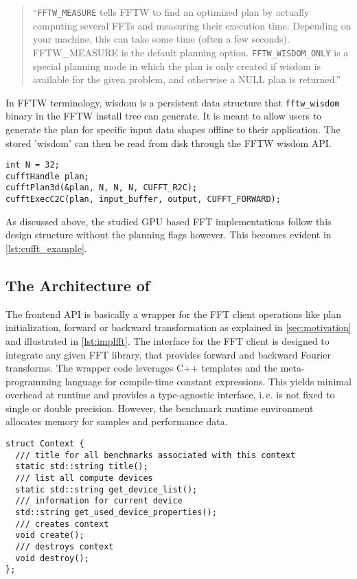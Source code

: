 %
\begin{quote}
``\texttt{FFTW\_MEASURE} tells FFTW to find an optimized plan by actually computing several FFTs and measuring their execution time. Depending on your machine, this can take some time (often a few seconds). FFTW\_MEASURE is the default planning option.\newline
\texttt{FFTW\_WISDOM\_ONLY} is a special planning mode in which the plan is only created if wisdom is available for the given problem, and otherwise a NULL plan is returned.''
\end{quote}
%
In FFTW terminology, wisdom is a persistent data structure that \texttt{fftw\_wisdom} binary in the FFTW install tree can generate. It is meant to allow users to generate the plan for specific input data shapes offline to their application. The stored 'wisdom' can then be read from disk through the FFTW wisdom API.
%
\begin{lstlisting}[caption={Minimal usage example of the cuFFT single precision real-to-complex planner API. Memory management is omitted.},label={lst:cufft_example}]
int N = 32;
cufftHandle plan;
cufftPlan3d(&plan, N, N, N, CUFFT_R2C);
cufftExecC2C(plan, input_buffer, output, CUFFT_FORWARD);
\end{lstlisting}
%
As discussed above, the studied GPU based FFT implementations follow this design structure without the planning flags however. This becomes evident in \cref{lst:cufft_example}.

\subsection{The Architecture of \gearshifft{}}
\label{ssec:gearshifft_arch}

The frontend API is basically a wrapper for the FFT client operations like plan initialization, forward or backward transformation as explained in \cref{sec:motivation} and illustrated in \cref{lst:implfft}.
The interface for the FFT client is designed to integrate any given FFT library, that provides forward and backward Fourier transforms.
The wrapper code leverages C++ templates and the meta-programming language for compile-time constant expressions.
This yields minimal overhead at runtime and provides a type-agnostic interface, i.\,e. \gearshifft{} is not fixed to single or double precision.
However, the benchmark runtime environment allocates memory for samples and performance data.

\begin{lstlisting}[caption={Context class required by gearshifft frontend API},label={lst:implcontext}]
struct Context {
  /// title for all benchmarks associated with this context
  static std::string title();
  /// list all compute devices
  static std::string get_device_list();
  /// information for current device
  std::string get_used_device_properties();
  /// creates context
  void create();
  /// destroys context
  void destroy();
};
\end{lstlisting}

